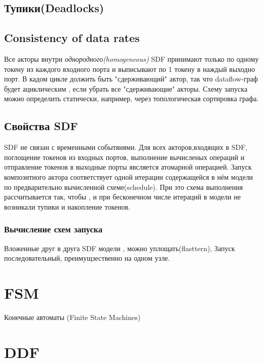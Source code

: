 \documentclass[a4paper,14pt]{article}
\begin{document}
\subsection{Тупики(Deadlocks)}
\subsection{Consistency of data rates}
Все акторы внутри \textit{однородного(homogeneous)} SDF принимают только по одному токену из каждого входного порта и выписывают по 1 токену в наждый выходно порт. В кадом цикле должить быть "сдерживающий" актор,  так что dataflow-граф будет ациклическим , если убрать все "сдерживающие" акторы. Схему запуска можно определить статически, например, через топологическая сортировка графа.
\subsection{Свойства SDF}
\par SDF не связан с временными событяиями. Для всех акторов,входящих в SDF,  поглощение токенов из входных портов, выполнение вычисленых операций и отправление токенов в выходные порты явсляется атомарной операцией. Запуск композитного актора соответствует одной итерации содержащейся в нём модели по предварительно вычисленной схеме(schedule). При это схема выполнения рассчитывается так, чтобы , и при бесконечном числе итераций в модели не возникали тупики и накопление токенов. 
\subsubsection{Вычисление схем запуска}
Вложенные друг в друга SDF модели , можно уплощать(flasttern),
Запуск последовательный, преимущзественно на одном узле.

\section*{FSM}
Конечные автоматы (Finite State Machines) 
\section*{DDF}
\end{document}
